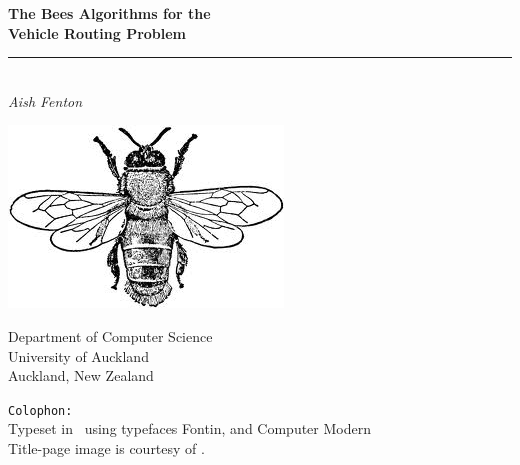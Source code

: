 

\begin{titlepage}


\vspace*{6em}

\begin{center}
   \LARGE\textbf{The Bees Algorithms for the\\ Vehicle Routing Problem\\}
   \rule{224pt}{0.75pt}\\
   \vspace*{0.75em}
   \rmfamily\large\textit{Aish Fenton}
\end{center}

\hspace{70pt}\includegraphics[scale=0.15, angle=315]{images/bee.jpeg}

\vfill
\small\rmfamily
\begin{flushright}
Department of Computer Science\\
University of Auckland \\
Auckland, New Zealand 
\end{flushright}

\end{titlepage}

\texttt{Colophon:}\\
Typeset in \XeTeX\ using typefaces  Fontin, \rmfamily and Computer Modern \\
Title-page image is courtesy of \cite{beeimage}.
